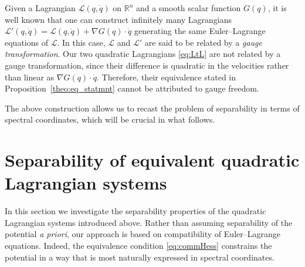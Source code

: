 \documentclass{rendiconti}
\begin{document}
\begin{remark}
Given a Lagrangian $\mathcal L(q,\dot q)$ on $\mathbb R^n$ and a smooth scalar function $G(q)$, it is well known that
one can construct infinitely many Lagrangians $
\mathcal L'(q,\dot q)
=
\mathcal L(q,\dot q) + \nabla G(q)\cdot \dot q
$
generating the same
Euler--Lagrange equations of  $\mathcal L$.
In this case, $\mathcal L$ and
$\mathcal L'$ are said to be related by a \emph{gauge transformation}.
Our two quadratic Lagrangians \eqref{eq:LtL} are not related by a gauge
transformation, since their difference is quadratic in the velocities rather
than linear as $\nabla G(q)\cdot \dot q$. Therefore, their equivalence  stated in Proposition~\ref{theo:eq_statmnt} cannot be attributed to gauge
freedom.
\end{remark}

The above construction allows us to recast the problem of separability in terms of spectral coordinates, which will be crucial in what follows.


\section{Separability of equivalent quadratic Lagrangian systems}
\label{sec:sep}

In this section we investigate the separability properties of the quadratic
Lagrangian systems introduced above. 
Rather than assuming separability of the
potential \emph{a priori}, our approach is based on compatibility of Euler--Lagrange equations.
Indeed, the equivalence condition \eqref{eq:commHess} constrains the potential in a way that is
most naturally expressed in spectral coordinates. 
\end{document}
